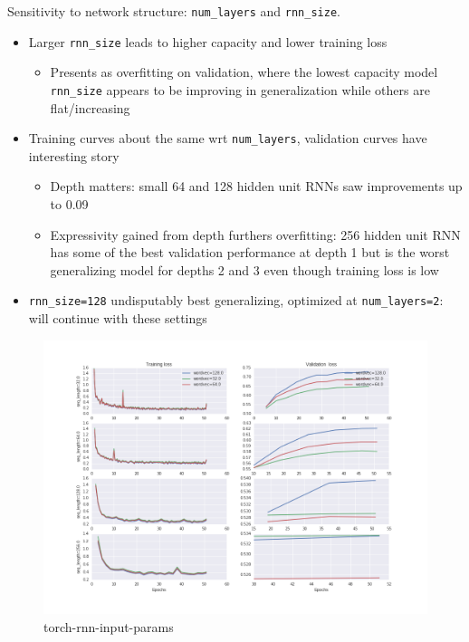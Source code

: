 Sensitivity to network structure: \texttt{num\_layers} and \texttt{rnn\_size}.
\begin{itemize}
    \item Larger \texttt{rnn\_size} leads to higher capacity and lower training loss
        \begin{itemize}
            \item Presents as overfitting on validation, where the lowest capacity
                model \texttt{rnn\_size} appears to be improving in generalization while
                others are flat/increasing
        \end{itemize}
    \item Training curves about the same wrt \texttt{num\_layers}, validation curves have interesting story
        \begin{itemize}
            \item Depth matters: small 64 and 128 hidden unit RNNs saw improvements up to 0.09
            \item Expressivity gained from depth furthers overfitting: 256
                hidden unit RNN has some of the best validation performance at
                depth 1 but is the worst generalizing model for depths 2
                and 3 even though training loss is low
        \end{itemize}
    \item \texttt{rnn\_size=128} undisputably best generalizing, optimized at
        \texttt{num\_layers=2}: will continue with these settings
\end{itemize}

\begin{figure}[htpb]
    \centering
    \includegraphics[width=\linewidth]{Figures/torch-rnn-input-params.png}
    \caption{torch-rnn-input-params}
    \label{fig:torch-rnn-input-params}
\end{figure}

